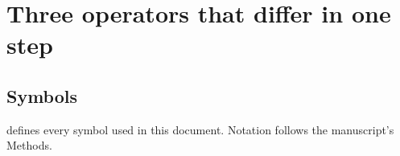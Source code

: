 
\section{Three operators that differ in one step}
\label{sec:operators}

\subsection{Symbols}

 defines every symbol used in this document. Notation follows the
manuscript's Methods.


